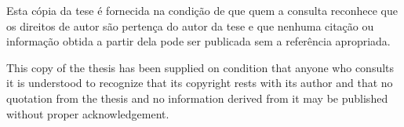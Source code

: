 
\thispagestyle{plain}
\newpage
\null
\vfill
Esta cópia da tese é fornecida na condição de que quem a consulta reconhece que os direitos de autor são pertença do autor da tese e que nenhuma citação ou informação obtida a partir dela pode ser publicada sem a referência apropriada.

This copy of the thesis has been supplied on condition that anyone who consults it is understood to recognize that its copyright rests with its author and that no quotation from the thesis and no information derived from it may be published without proper acknowledgement.
